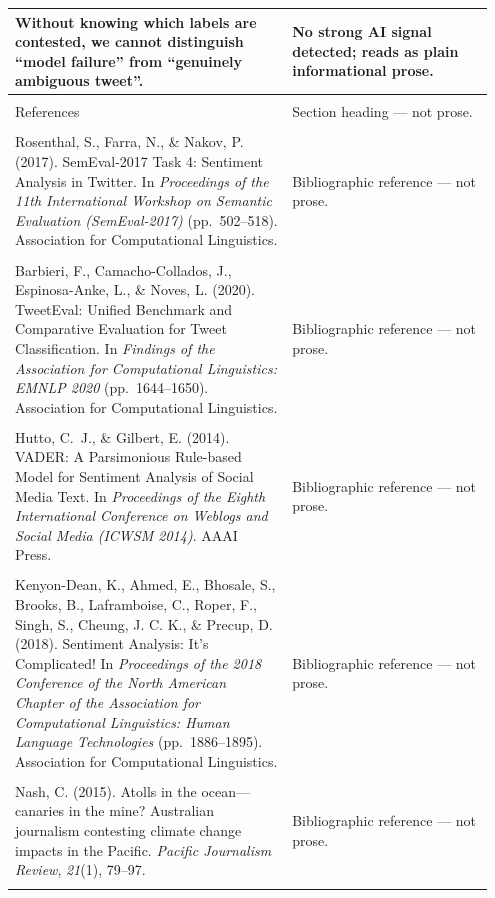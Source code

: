 \documentclass[11pt]{article}
\begin{document}
\begin{longtable}{|p{0.55\linewidth}|p{0.40\linewidth}|}
\hline
Without knowing which labels are contested, we cannot distinguish ``model failure'' from ``genuinely ambiguous tweet''. & No strong AI signal detected; reads as plain informational prose. \\[2pt]
\hline
\rule{0pt}{3.5cm} & \\
\hline
References & Section heading --- not prose. \\[2pt]
\hline
\rule{0pt}{3.5cm} & \\
\hline
Rosenthal, S., Farra, N., \& Nakov, P. (2017). SemEval-2017 Task 4: Sentiment Analysis in Twitter. In \textit{Proceedings of the 11th International Workshop on Semantic Evaluation (SemEval-2017)} (pp.\ 502--518). Association for Computational Linguistics. & Bibliographic reference --- not prose. \\[2pt]
\hline
\rule{0pt}{3.5cm} & \\
\hline
Barbieri, F., Camacho-Collados, J., Espinosa-Anke, L., \& Noves, L. (2020). TweetEval: Unified Benchmark and Comparative Evaluation for Tweet Classification. In \textit{Findings of the Association for Computational Linguistics: EMNLP 2020} (pp.\ 1644--1650). Association for Computational Linguistics. & Bibliographic reference --- not prose. \\[2pt]
\hline
\rule{0pt}{3.5cm} & \\
\hline
Hutto, C.~J., \& Gilbert, E. (2014). VADER: A Parsimonious Rule-based Model for Sentiment Analysis of Social Media Text. In \textit{Proceedings of the Eighth International Conference on Weblogs and Social Media (ICWSM 2014)}. AAAI Press. & Bibliographic reference --- not prose. \\[2pt]
\hline
\rule{0pt}{3.5cm} & \\
\hline
Kenyon-Dean, K., Ahmed, E., Bhosale, S., Brooks, B., Laframboise, C., Roper, F., Singh, S., Cheung, J. C. K., \& Precup, D. (2018). Sentiment Analysis: It's Complicated! In \textit{Proceedings of the 2018 Conference of the North American Chapter of the Association for Computational Linguistics: Human Language Technologies} (pp.\ 1886--1895). Association for Computational Linguistics. & Bibliographic reference --- not prose. \\[2pt]
\hline
\rule{0pt}{3.5cm} & \\
\hline
Nash, C. (2015). Atolls in the ocean---canaries in the mine? Australian journalism contesting climate change impacts in the Pacific. \textit{Pacific Journalism Review}, \textit{21}(1), 79--97. & Bibliographic reference --- not prose. \\[2pt]
\hline
\rule{0pt}{3.5cm} & \\
\hline
\end{longtable}
\end{document}
